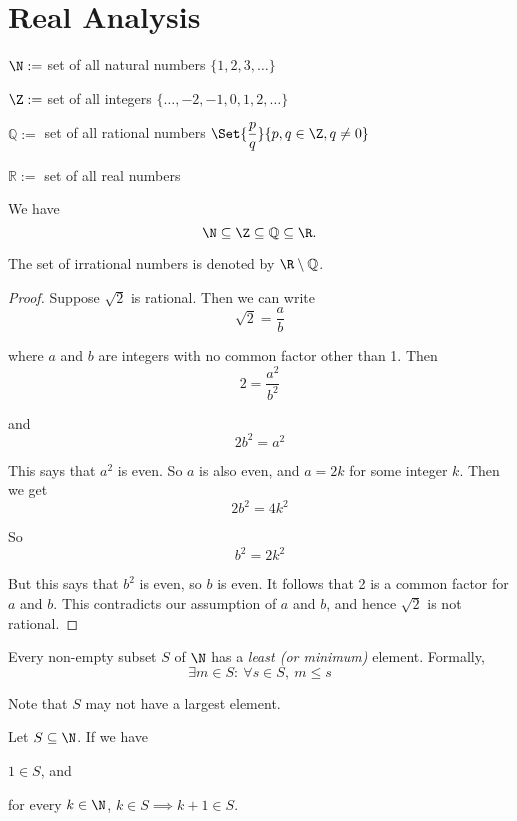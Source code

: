 \section{Real Analysis}\label{cd94400}

\label{d52c6b7}

\begin{enumerati}
  \item $\N:=$ set of all natural numbers $\{1,2,3,\ldots\}$
  \item $\Z:=$ set of all integers $\{\ldots,-2,-1,0,1,2,\ldots\}$
  \item $\mathbb Q:=$ set of all rational numbers $\Set{\dfrac pq}{p,q\in\Z,q\neq0}$
  \item $\mathbb R:=$ set of all real numbers
\end{enumerati}

We have
$$
  \N\subseteq\Z\subseteq\mathbb Q\subseteq\R.
$$

The set of irrational numbers is denoted by $\R\setminus\mathbb Q$.

\label{c2585a1}

\begin{proof}
  Suppose $\sqrt2$ is rational. Then we can write
  $$\sqrt2=\frac ab$$

  where $a$ and $b$ are integers with no common factor other than 1. Then
  $$2=\frac{a^2}{b^2}$$

  and
  $$2b^2=a^2$$

  This says that $a^2$ is even. So $a$ is also even, and $a=2k$ for some integer
  $k$. Then we get
  $$2b^2=4k^2$$

  So
  $$b^2=2k^2$$

  But this says that $b^2$ is even, so $b$ is even. It follows that 2 is a common
  factor for $a$ and $b$. This contradicts our assumption of $a$ and $b$, and
  hence $\sqrt2$ is not rational.
\end{proof}

\label{cd7c4d1}

Every non-empty subset $S$ of $\N$ has a \textit{least (or minimum)} element.
Formally,
$$
  \exists m\in S:\ \forall s\in S,\ m\leq s
$$

Note that $S$ may not have a largest element.

\label{a824f8c}

Let $S\subseteq\N$. If we have
\begin{enumerati}
  \item $1\in S$, and
  \item for every $k\in\N$, $k\in S\implies k+1\in S$.
\end{enumerati}

